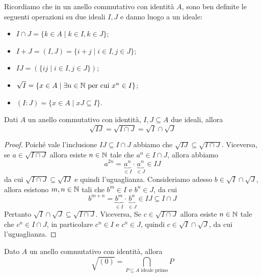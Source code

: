 \documentclass[11pt]{scrartcl}
\begin{document}
Ricordiamo che in un anello commutativo con identità $A$, sono ben definite
le seguenti operazioni su due ideali $I, J$ e danno luogo a un ideale:
\begin{itemize}
    \item $I\cap J = \{k \in A \mid k \in I, k \in J\}$;
    \item $I + J = (I, J) = \{i + j \mid i \in I, j \in J\}$;
    \item $IJ = (\{ij\mid i \in I, j \in J\})$;
    \item $\sqrt{I} = \{x \in A \mid \exists n \in \mathbb N \text{ per cui } x^n \in I\}$;
    \item $(I : J) = \{x \in A \mid xJ \subseteq I\}$.
\end{itemize}

\begin{proposition}
    Dati $A$ un anello commutativo con identità, $I, J \subseteq A$ due ideali,
    allora
    \[
        \sqrt{IJ} = \sqrt{I\cap J} = \sqrt{I}\cap \sqrt{J}
    \]
\end{proposition}

\begin{proof}
    Poiché vale l'inclusione $IJ \subseteq I\cap J$ abbiamo che $\sqrt{IJ}
    \subseteq \sqrt{I\cap J}$. Viceversa, se $a \in \sqrt{I\cap J}$ allora
    esiste $n \in \mathbb N$ tale che $a^n \in I\cap J$, allora abbiamo 
    \[
        a^{2n} = \underset{\in I}{\underbrace{a^n}} \cdot \underset{\in J}{\underbrace{a^n}}
        \in IJ
    \]
    da cui $\sqrt{I\cap J} \subseteq \sqrt{IJ}$ e quindi l'uguaglianza.\newline
    Consideriamo adesso $b \in \sqrt{I}\cap \sqrt{J}$, allora esistono $m, n \in \mathbb N$
    tali che $b^m \in I$ e $b^n \in J$, da cui
    \[
        b^{m + n} = \underset{\in I}{\underbrace{b^m}}\cdot
        \underset{\in J}{\underbrace{b^n}} \in IJ \subseteq I\cap J
    \]
    Pertanto $\sqrt{I}\cap \sqrt{J} \subseteq \sqrt{I\cap J}$. Viceversa, Se
    $c \in \sqrt{I\cap J}$ allora esiste $n \in \mathbb N$ tale che $c^n \in I\cap J$, 
    in particolare $c^n \in I$ e $c^n \in J$, quindi $c \in \sqrt{I}\cap\sqrt{J}$,
    da cui l'uguaglianza.
\end{proof}

\begin{proposition}
    \label{prop2.9}
    Dato $A$ un anello commutativo con identità, allora
    \[
        \sqrt{(0)} = \bigcap_{P \subseteq A\text{ ideale primo}}P
    \]
\end{proposition}
\end{document}
